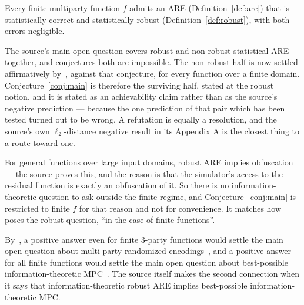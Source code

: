 \documentclass{aicr-conjecture}
\begin{document}
\begin{conjecture}\label{conj:main}
Every finite multiparty function $f$ admits an ARE
(Definition~\ref{def:are}) that is statistically correct and
statistically robust (Definition~\ref{def:robust}), with both errors
negligible.
\end{conjecture}

\begin{remark}\label{rem:half}
The source's main open question covers robust and non-robust statistical
ARE together, and conjectures both are impossible. The non-robust half is
now settled affirmatively by~\cite{BEGI25}, against that conjecture, for
every function over a finite domain. Conjecture~\ref{conj:main} is
therefore the surviving half, stated at the robust notion, and it is
stated as an achievability claim rather than as the source's negative
prediction --- because the one prediction of that pair which has been
tested turned out to be wrong. A refutation is equally a resolution, and
the source's own $\ell_{2}$-distance negative result in its Appendix A is
the closest thing to a route toward one.
\end{remark}

\begin{remark}
For general functions over large input domains, robust ARE implies
obfuscation --- the source proves this, and the reason is that the
simulator's access to the residual function is exactly an obfuscation of
it. So there is no information-theoretic question to ask outside the
finite regime, and Conjecture~\ref{conj:main} is restricted to finite $f$
for that reason and not for convenience. It matches how~\cite{BEGI25}
poses the robust question, ``in the case of finite functions''.
\end{remark}

\begin{remark}
By~\cite{BEGI25}, a positive answer even for finite $3$-party functions
would settle the main open question about multi-party randomized
encodings~\cite{ABT21}, and a positive answer for all finite functions
would settle the main open question about best-possible
information-theoretic MPC~\cite{HIKR18}. The source itself makes the
second connection when it says that information-theoretic robust ARE
implies best-possible information-theoretic MPC\@.
\end{remark}
\end{document}
